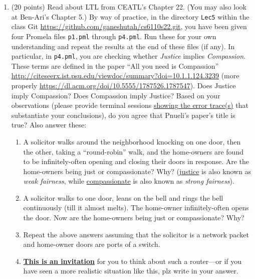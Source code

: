 \documentclass[11pt]{article}
\begin{document}
\begin{enumerate}
  
\item (20 points) Read about LTL from 
  CEATL's Chapter 22.
  (You may also look at Ben-Ari's Chapter 5.)
  By way of practice,
  in the directory {\tt Lec5}
  within the class Git
  \url{https://github.com/ganeshutah/cs6110s22.git},
  you have been given four Promela files {\tt p1.pml}
  through {\tt p4.pml}.   
  Run these for your own understanding and repeat the results
  at the end of these files (if any).
  In particular, in {\tt p4.pml}, you are checking
  whether {\em Justice} implies {\em Compassion}.
  These terms are defined in the paper
  ``All you need is Compassion''
  \url{http://citeseerx.ist.psu.edu/viewdoc/summary?doi=10.1.1.124.3239}
  (more properly \url{https://dl.acm.org/doi/10.5555/1787526.1787547}).
  Does Justice imply Compassion?
  Does Compassion imply Justice?
  Based on your observations (please provide terminal sessions \underline{showing
  the error trace(s)} that substantiate your conclusions),
  do you agree that Pnueli's paper's title is true?
  Also answer these:
  \begin{enumerate}
  \item A solicitor walks around the neighborhood knocking on one door,
    then the other, taking a ``round-robin'' walk, and the home-owners
    are found to be infinitely-often opening and closing their doors
    in response.
    Are the home-owners being just or compassionate? Why?
    (\underline{justice} is also known as {\em weak fairness}, while
    \underline{compassionate} is also known as {\em strong fairness}).

  \item A solicitor walks to one door, leans on the bell and rings
    the bell continuously (till it almost melts).
    The home-owner infinitely-often opens the door.
    Now are the home-owners being just or compassionate?     Why?

  \item Repeat the above answers assuming that the solicitor is
    a network packet and home-owner doors are ports of a switch.
  \item[] \underline{\bf This is an invitation} for you to think
    about such a router---or if you have seen a more realistic situation
    like this, plz write in your answer.
  \end{enumerate}



\end{enumerate}
\end{document}
